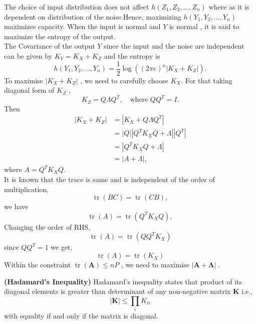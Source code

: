The choice of input distribution does not affect \( h(Z_1, Z_2, \ldots, Z_n) \) where as it is dependent on distribution of the noise.Hence, maximizing \( h(Y_1, Y_2, \ldots, Y_n) \) maximizes capacity.
When the input is normal and \( Y \) is normal , it is said to maximize the entropy of the output.
\\
The Covariance of the output \( Y \) since the input and the noise are independent can be given by \( K_Y = K_X + K_Z \) and the entropy is
\begin{equation}
h(Y_1, Y_2, \ldots, Y_n) = \frac{1}{2} \log((2 \pi e)^n |K_X + K_Z|).
\tag{10.80}
\end{equation}
To maximise \( |K_X + K_Z| \) , we need to carefully choose \( K_X \). For that taking diagonal form of \( K_Z \) ,
\begin{equation}
K_Z = Q \Lambda Q^T, \quad \text{where } Q Q^T = I.
\tag{10.81}
\end{equation}
Then
\begin{align}
|K_X + K_Z| &= |K_X + Q \Lambda Q^T| \tag{10.82} \\
&= |Q| |Q^T K_X Q + \Lambda| |Q^T| \tag{10.83} \\
&= |Q^T K_X Q + \Lambda| \tag{10.84} \\
&= |A + \Lambda|, \tag{10.85}
\end{align}
where \( A = Q^T K_X Q \).
\\
It is known that the trace is same and is independent of the order of multiplication,
\begin{equation}
\operatorname{tr}(BC) = \operatorname{tr}(CB),
\tag{10.86}
\end{equation}
we have
\begin{equation}
\operatorname{tr}(A) = \operatorname{tr}(Q^T K_X Q),
\tag{10.86}
\end{equation}
%
Changing the order of RHS,
\begin{equation}
\operatorname{tr}(A) = \operatorname{tr}(QQ^T K_X )
\tag{10.86}
\end{equation}
%
since $QQ^T = 1$ we get, 
\begin{equation}
\operatorname{tr}(A) = \operatorname{tr}( K_X )
\tag{10.86}
\end{equation}
%
Within the constraint \( \operatorname{tr}(\mathbf{A}) \leq nP \) , we need to maximise \( |\mathbf{A} + \mathbf{\Lambda}| \) .
%
\begin{tcolorbox}[boxrule=0pt,frame hidden,sharp corners,enhanced, opacityback=0, borderline west={2pt}{0pt}{red}]
\begin{defn} \textbf{(Hadamard's Inequality)} Hadamard's inequality states that product of its diagonal elements is greater than determinant of any non-negative matrix \( \mathbf{K} \)  i.e.,
\begin{equation}
|\mathbf{K}| \leq \prod_i K_{ii}
\end{equation}
with equality if and only if the matrix is diagonal.
\end{defn}
\end{tcolorbox}
